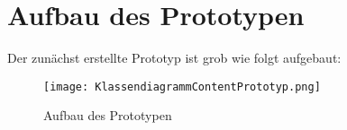 \author{Gottfried von Recum}
\chapter{Aufbau des Prototypen}

Der zunächst erstellte Prototyp ist grob wie folgt aufgebaut:
\begin{figure}[ht]
	\centering
	\texttt{[image: KlassendiagrammContentPrototyp.png]}
	\caption{Aufbau des Prototypen}
	\label{fig:Prototypaufbau}
\end{figure}